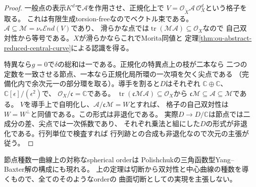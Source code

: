 \documentclass[11pt,a4paper]{ltjsarticle}
\theoremstyle{definition}
\begin{document}
\begin{proof}
一般点の表示$K^d$で$\mathcal A$を作用させ、正規化上で
$V=\mathcal O_{\widetilde X}\mathcal A\,\mathcal O_X^d$という格子を取る。
これは有限生成torsion-freeなのでベクトル束である。
$\mathcal A\subseteq\mathcal M=\nu_*\mathcal End(V)$であり、
滑らかな点では$\operatorname{tr}(\mathcal M\mathcal A)\subseteq\mathcal O_X$なので
自己双対性から等号である。$X$が滑らかならこれでMorita同値と
定理\ref{thm:ou-abstract-reduced-central-curve}による認識を得る。

特異なら$g=0$で$\delta$の総和は一である。正規化の特異点上の枝が二本なら
二つの定数を一致させる節点、一本なら正規化局所環の一次項を欠く尖点である
（完備化内で余次元一の部分環を取る）。導手を割ると$D$はそれぞれ
$\mathbb C\oplus\mathbb C$、$\mathbb C[\epsilon]/(\epsilon^2)$で、
$\mathcal O_X/\mathfrak c=\mathbb C$である。
$\operatorname{tr}(\mathfrak c\mathcal M\mathcal A)\subseteq\mathcal O_X$から
$\mathfrak c\mathcal M\subseteq\mathcal A\subseteq\mathcal M$である。
$V$を導手上で自明化し、$\mathcal A/\mathfrak c\mathcal M=W$とすれば、
格子の自己双対性は$W=W^\perp$と同値である。この形式は非退化である。
実際$D\to D/\mathbb C$は節点では二成分の差、尖点では一次係数であり、
それぞれ乗法と組にした$D$の形式が非退化である。行列単位で検査すれば
行列跡との合成も非退化なので次元の主張が従う。
\end{proof}

節点種数一曲線上の対称なspherical orderは
Polishchuk\cite{Polishchuk2023Orders}の三角函数型Yang--Baxter解の構成にも現れる。
上の定理は切断から双対性と中心曲線の種数を導くもので、全てのそのようなorderの
曲面切断としての実現を主張しない。
\end{document}

